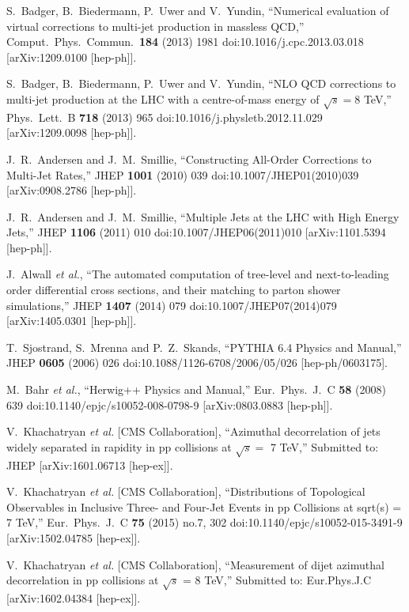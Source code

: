 \documentclass{PoS}
\begin{document}
\begin{thebibliography}{99}
  S.~Badger, B.~Biedermann, P.~Uwer and V.~Yundin,
  ``Numerical evaluation of virtual corrections to multi-jet production in massless QCD,''
  Comput.\ Phys.\ Commun.\  {\bf 184} (2013) 1981
  doi:10.1016/j.cpc.2013.03.018
  [arXiv:1209.0100 [hep-ph]].

  S.~Badger, B.~Biedermann, P.~Uwer and V.~Yundin,
  ``NLO QCD corrections to multi-jet production at the LHC with a centre-of-mass energy of $\sqrt{s}=8$ TeV,''
  Phys.\ Lett.\ B {\bf 718} (2013) 965
  doi:10.1016/j.physletb.2012.11.029
  [arXiv:1209.0098 [hep-ph]].

  J.~R.~Andersen and J.~M.~Smillie,
  ``Constructing All-Order Corrections to Multi-Jet Rates,''
  JHEP {\bf 1001} (2010) 039
  doi:10.1007/JHEP01(2010)039
  [arXiv:0908.2786 [hep-ph]].

  J.~R.~Andersen and J.~M.~Smillie,
  ``Multiple Jets at the LHC with High Energy Jets,''
  JHEP {\bf 1106} (2011) 010
  doi:10.1007/JHEP06(2011)010
  [arXiv:1101.5394 [hep-ph]].

  J.~Alwall {\it et al.},
  ``The automated computation of tree-level and next-to-leading order differential cross sections, and their matching to parton shower simulations,''
  JHEP {\bf 1407} (2014) 079
  doi:10.1007/JHEP07(2014)079
  [arXiv:1405.0301 [hep-ph]].

  T.~Sjostrand, S.~Mrenna and P.~Z.~Skands,
  ``PYTHIA 6.4 Physics and Manual,''
  JHEP {\bf 0605} (2006) 026
  doi:10.1088/1126-6708/2006/05/026
  [hep-ph/0603175].

  M.~Bahr {\it et al.},
  ``Herwig++ Physics and Manual,''
  Eur.\ Phys.\ J.\ C {\bf 58} (2008) 639
  doi:10.1140/epjc/s10052-008-0798-9
  [arXiv:0803.0883 [hep-ph]].

  V.~Khachatryan {\it et al.} [CMS Collaboration],
  ``Azimuthal decorrelation of jets widely separated in rapidity in pp collisions at $\sqrt{s} =$ 7 TeV,''
  Submitted to: JHEP
  [arXiv:1601.06713 [hep-ex]].

  V.~Khachatryan {\it et al.} [CMS Collaboration],
  ``Distributions of Topological Observables in Inclusive Three- and Four-Jet Events in pp Collisions at sqrt(s) = 7 TeV,''
  Eur.\ Phys.\ J.\ C {\bf 75} (2015) no.7,  302
  doi:10.1140/epjc/s10052-015-3491-9
  [arXiv:1502.04785 [hep-ex]].

  V.~Khachatryan {\it et al.} [CMS Collaboration],
  ``Measurement of dijet azimuthal decorrelation in pp collisions at $\sqrt{s}$ = 8 TeV,''
  Submitted to: Eur.Phys.J.C
  [arXiv:1602.04384 [hep-ex]].


\end{thebibliography}
\end{document}
